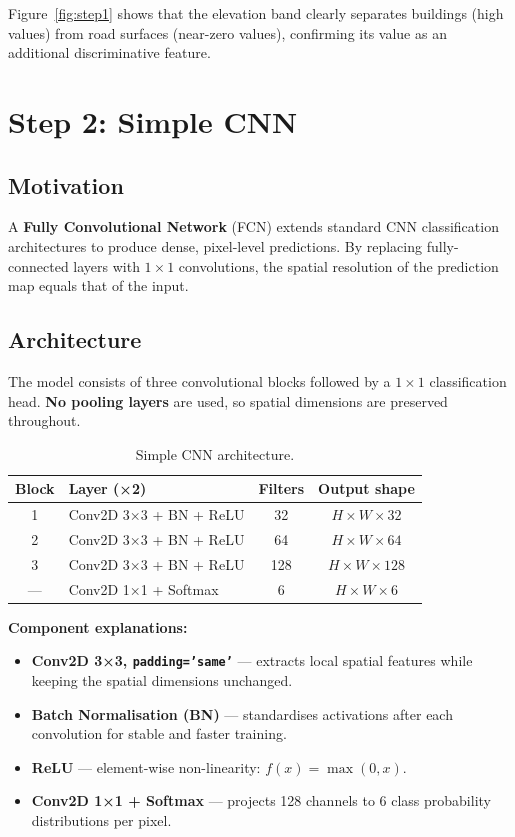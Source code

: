 \documentclass[12pt,a4paper]{article}
\begin{document}
Figure~\ref{fig:step1} shows that the elevation band clearly separates buildings
(high values) from road surfaces (near-zero values), confirming its value
as an additional discriminative feature.

\section{Step 2: Simple CNN}

\subsection{Motivation}

A \textbf{Fully Convolutional Network} (FCN) extends standard CNN classification
architectures to produce dense, pixel-level predictions. By replacing fully-connected
layers with $1 \times 1$ convolutions, the spatial resolution of the prediction
map equals that of the input.

\subsection{Architecture}

The model consists of three convolutional blocks followed by a $1 \times 1$
classification head. \textbf{No pooling layers} are used, so spatial dimensions
are preserved throughout.

\begin{table}[h!]
  \centering
  \caption{Simple CNN architecture.}
  \begin{tabular}{clcc}
    \toprule
    \textbf{Block} & \textbf{Layer (×2)} & \textbf{Filters} & \textbf{Output shape} \\
    \midrule
    1 & Conv2D 3×3 + BN + ReLU & 32  & $H \times W \times 32$ \\
    2 & Conv2D 3×3 + BN + ReLU & 64  & $H \times W \times 64$ \\
    3 & Conv2D 3×3 + BN + ReLU & 128 & $H \times W \times 128$ \\
    — & Conv2D 1×1 + Softmax    & 6   & $H \times W \times 6$ \\
    \bottomrule
  \end{tabular}
\end{table}

\textbf{Component explanations:}
\begin{itemize}[itemsep=3pt]
  \item \textbf{Conv2D 3×3, \texttt{padding='same'}} — extracts local spatial
    features while keeping the spatial dimensions unchanged.
  \item \textbf{Batch Normalisation (BN)} — standardises activations after each
    convolution for stable and faster training.
  \item \textbf{ReLU} — element-wise non-linearity: $f(x) = \max(0, x)$.
  \item \textbf{Conv2D 1×1 + Softmax} — projects 128 channels to 6 class
    probability distributions per pixel.
\end{itemize}
\end{document}
